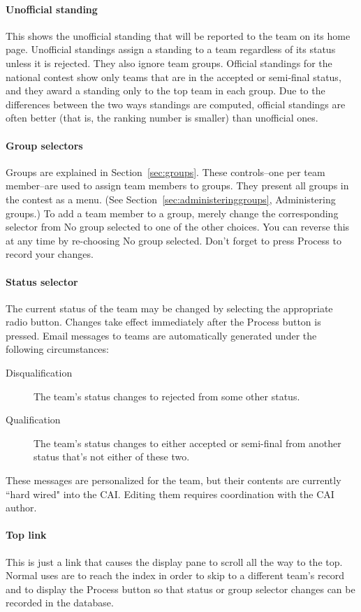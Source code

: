 \documentclass[11pt,letterpaper]{refart}
\def\ui#1{\textsf{#1}}
\begin{document}
\paragraph{Unofficial standing}
This shows the unofficial standing that will be reported to the team
on its home page. Unofficial standings assign a standing to a team
regardless of its status unless it is rejected. They also ignore team
groups. Official standings for the national contest show only teams
that are in the accepted or semi-final status, and they award a
standing only to the top team in each group. Due to the differences
between the two ways standings are computed, official standings are
often better (that is, the ranking number is smaller) than unofficial
ones.

\paragraph{Group selectors}
Groups are explained in Section~\ref{sec:groups}.
These controls--one per team member--are used to assign team members
to groups. They present all groups in the contest as a menu.
(See Section~\ref{sec:administeringgroups}, Administering groups.)
To add a team member to a
group, merely change the corresponding selector
from \ui{No group selected} to one
of the other choices. You can reverse this at any time by re-choosing
\ui{No group selected}. Don't forget to press
\ui{Process} to record your changes.

\paragraph{Status selector}
The current status of the team may be changed by selecting the
appropriate radio button. Changes take effect immediately after the
\ui{Process} button is pressed. Email messages to teams are
automatically generated under the following circumstances:
\begin{description}
\item[Disqualification] The team's status changes to rejected from some other status.
\item[Qualification] The team's status changes to either accepted or
semi-final from another status that's not either of these two.
\end{description}
These messages are personalized for the team, but their contents are currently
``hard wired" into the CAI. Editing them requires coordination with the CAI 
author.

\paragraph{Top link}
This is just a link that causes the display pane to scroll all the way
to the top. Normal uses are to reach the index in order to skip to a
different team's record and to display the \ui{Process} button so that
status or group selector changes can be recorded in the database.
\end{document}
